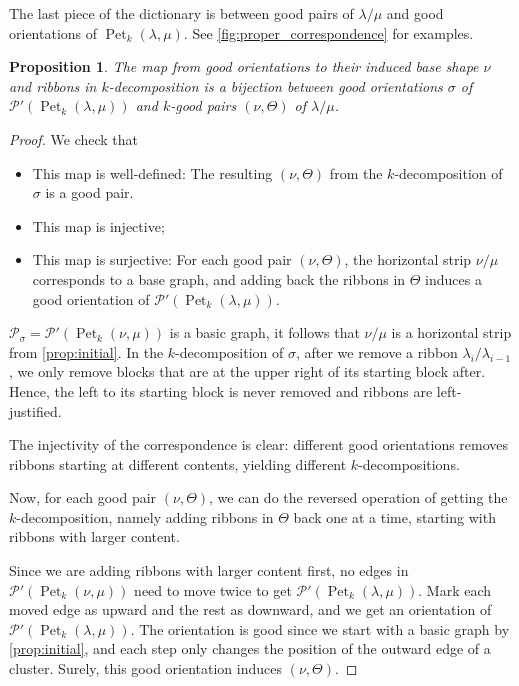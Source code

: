 \documentclass[pdflatex,sn-mathphys-num]{sn-jnl}%
\theoremstyle{thmstyleone}%
\newtheorem{proposition}[theorem]{Proposition}
\theoremstyle{thmstyletwo}%
\theoremstyle{thmstylethree}%
\numberwithin{equation}{section}
\DeclareMathOperator{\Pet}{Pet}
\begin{document}
    The last piece of the dictionary is between good pairs of $\lambda/\mu$ and good orientations of $\Pet_k(\lambda,\mu)$. See \cref{fig:proper_correspondence} for examples.
    \begin{proposition}\label{prop:translation}
        The map from good orientations to their induced base shape $\nu$ and ribbons in $k$-decomposition is a bijection between good orientations $\sigma$ of $\mathcal{P}'(\Pet_k(\lambda,\mu))$ and $k$-good pairs $(\nu,\Theta)$ of $\lambda/\mu$.
    \end{proposition}
    \begin{proof}
        We check that
        \begin{itemize}
            \item This map is well-defined: The resulting $(\nu,\Theta)$ from the $k$-decomposition of $\sigma$ is a good pair.
            \item This map is injective;
            \item This map is surjective: For each good pair $(\nu,\Theta)$, the horizontal strip $\nu/\mu$ corresponds to a base graph, and adding back the ribbons in $\Theta$ induces a good orientation of $\mathcal{P}'(\Pet_k(\lambda,\mu))$.
        \end{itemize}
        $\mathcal{P}_\sigma=\mathcal{P}'(\Pet_k(\nu,\mu))$ is a basic graph, it follows that $\nu/\mu$ is a horizontal strip from \cref{prop:initial}. In the $k$-decomposition of $\sigma$, after we remove a ribbon $\lambda_i/\lambda_{i-1}$, we only remove blocks that are at the upper right of its starting block after. Hence, the left to its starting block is never removed and ribbons are left-justified.

        The injectivity of the correspondence is clear: different good orientations removes ribbons starting at different contents, yielding different $k$-decompositions. 

        Now, for each good pair $(\nu,\Theta)$, we can do the reversed operation of getting the $k$-decomposition, namely adding ribbons in $\Theta$ back one at a time, starting with ribbons with larger content. 
        
        Since we are adding ribbons with larger content first, no edges in $\mathcal{P}'(\Pet_k(\nu,\mu))$ need to move twice to get $\mathcal{P}'(\Pet_k(\lambda,\mu))$. Mark each moved edge as upward and the rest as downward, and we get an orientation of $\mathcal{P}'(\Pet_k(\lambda,\mu))$. The orientation is good since we start with a basic graph by \cref{prop:initial}, and each step only changes the position of the outward edge of a cluster. Surely, this good orientation induces $(\nu,\Theta)$.
    \end{proof} 
    
\end{document}
